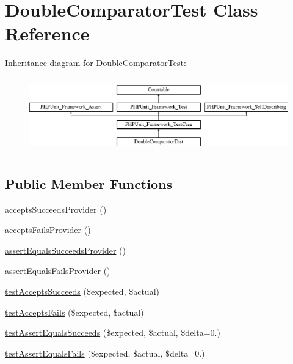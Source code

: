 \hypertarget{class_sebastian_bergmann_1_1_comparator_1_1_double_comparator_test}{}\section{Double\+Comparator\+Test Class Reference}
\label{class_sebastian_bergmann_1_1_comparator_1_1_double_comparator_test}
Inheritance diagram for Double\+Comparator\+Test\+:\begin{figure}[H]
\begin{center}
\leavevmode
\includegraphics[height=3.303835cm]{class_sebastian_bergmann_1_1_comparator_1_1_double_comparator_test}
\end{center}
\end{figure}
\subsection*{Public Member Functions}
\begin{DoxyCompactItemize}
\item 
\mbox{\hyperlink{class_sebastian_bergmann_1_1_comparator_1_1_double_comparator_test_a2ca71e8095ac10e058cd9d7a68da8608}{accepts\+Succeeds\+Provider}} ()
\item 
\mbox{\hyperlink{class_sebastian_bergmann_1_1_comparator_1_1_double_comparator_test_a9ea19e26cacbca06356c2f229079f8a1}{accepts\+Fails\+Provider}} ()
\item 
\mbox{\hyperlink{class_sebastian_bergmann_1_1_comparator_1_1_double_comparator_test_acb6bc1b6e9d32990bdd287f8b590a5fa}{assert\+Equals\+Succeeds\+Provider}} ()
\item 
\mbox{\hyperlink{class_sebastian_bergmann_1_1_comparator_1_1_double_comparator_test_a3cc10e39239b6e3f3fda1d34c0fb1c14}{assert\+Equals\+Fails\+Provider}} ()
\item 
\mbox{\hyperlink{class_sebastian_bergmann_1_1_comparator_1_1_double_comparator_test_a907ea73398b22f4a8cf37728cfc981e3}{test\+Accepts\+Succeeds}} (\$expected, \$actual)
\item 
\mbox{\hyperlink{class_sebastian_bergmann_1_1_comparator_1_1_double_comparator_test_afe5eff1a1b7049f973a035117a7e0df1}{test\+Accepts\+Fails}} (\$expected, \$actual)
\item 
\mbox{\hyperlink{class_sebastian_bergmann_1_1_comparator_1_1_double_comparator_test_aad90dcf32f0451135282025c43fb9661}{test\+Assert\+Equals\+Succeeds}} (\$expected, \$actual, \$delta=0.)
\item 
\mbox{\hyperlink{class_sebastian_bergmann_1_1_comparator_1_1_double_comparator_test_a8efcbbd3edf65fab391544da6525c167}{test\+Assert\+Equals\+Fails}} (\$expected, \$actual, \$delta=0.)
\end{DoxyCompactItemize}

